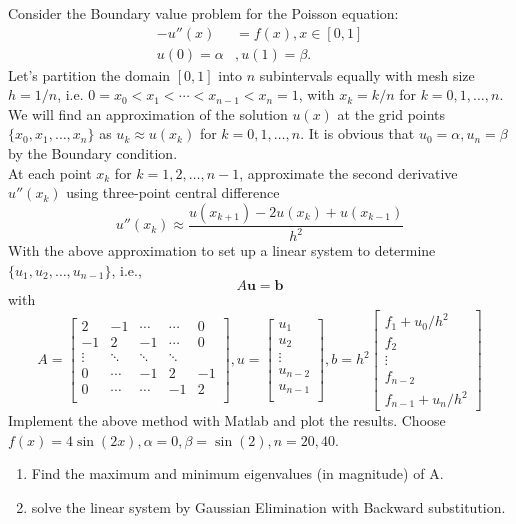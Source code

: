 \documentclass[10pt]{jhwhw}
\begin{document}
	Consider the Boundary value problem for the Poisson equation:
	\begin{align*}
		-u''(x) &= f(x), x\in [0,1] \\
		u(0) = \alpha&, u(1) = \beta.
	\end{align*}
	Let's partition the domain $[0,1]$ into $n$ subintervals equally with mesh size
	$h=1/n$, i.e. $0=x_0 < x_1 < \cdots < x_{n-1} < x_n = 1$, with $x_k = k/n$ for
	$k = 0, 1, \ldots, n$. We will find an approximation of the solution $u(x)$ at the grid
	points $\{x_0, x_1, \ldots, x_n\}$ as $u_k \approx u(x_k)$ for $k=0,1,\ldots,n$.
	It is obvious that $u_0 = \alpha, u_n = \beta$ by the Boundary condition. \\
	At each point $x_k$ for $k=1,2,\ldots,n-1$, approximate the second derivative $u''(x_k)$
	using three-point central difference
	$$
		u''(x_k) \approx \frac{u(x_{k+1}) - 2u(x_k) + u(x_{k-1})}{h^2}
	$$
	With the above approximation to set up a linear system to determine
	$\{u_1, u_2, \ldots, u_{n-1}\}$, i.e.,
	$$
		A\mathbf{u} = \mathbf{b}
	$$
	with 
	$$
	A = \begin{bmatrix}
		2 & -1 & \cdots & \cdots & 0 \\
		-1 & 2 & -1 & \cdots & 0 \\
		\vdots & \ddots & \ddots & \ddots & \\
		0 & \cdots & -1 & 2 & -1 \\
		0 & \cdots & \cdots & -1 & 2 \\
	\end{bmatrix},
	u = \begin{bmatrix}
		u_1 \\
		u_2 \\
		\vdots \\
		u_{n-2} \\
		u_{n-1} \\
	\end{bmatrix},
	b = h^2\begin{bmatrix}
		f_1 + u_0/h^2 \\
		f_2 \\
		\vdots \\
		f_{n-2} \\
		f_{n-1} + u_n/h^2
	\end{bmatrix}
	$$
	Implement the above method with Matlab and plot the results. 
	Choose $f(x) = 4\sin(2x), \alpha = 0, \beta = \sin(2), n=20,40$.
	\begin{enumerate}
		\item Find the maximum and minimum eigenvalues (in magnitude) of A.
		\item solve the linear system by Gaussian Elimination with Backward substitution.
	\end{enumerate}
\end{document}
